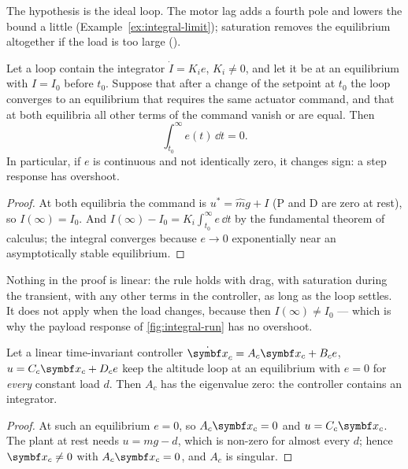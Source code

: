The hypothesis is the ideal loop. The motor lag adds a fourth pole and lowers the bound a little (Example~\ref{ex:integral-limit}); saturation removes the equilibrium altogether if the load is too large ().

\begin{theorem}
\label{thm:integral-area}
Let a loop contain the integrator $\dot I = K_i e$, $K_i \ne 0$, and let it be at an equilibrium with $I = I_0$ before $t_0$. Suppose that after a change of the setpoint at $t_0$ the loop converges to an equilibrium that requires the same actuator command, and that at both equilibria all other terms of the command vanish or are equal. Then
\begin{equation*}
  \int_{t_0}^{\infty} e(t)\,\dd t = 0 .
\end{equation*}
In particular, if $e$ is continuous and not identically zero, it changes sign: a step response has overshoot.
\end{theorem}
\begin{proof}
At both equilibria the command is $u^* = \hat m g + I$ (P and D are zero at rest), so $I(\infty) = I_0$. And $I(\infty) - I_0 = K_i\int_{t_0}^\infty e\,\dd t$ by the fundamental theorem of calculus; the integral converges because $e \to 0$ exponentially near an asymptotically stable equilibrium.
\end{proof}

Nothing in the proof is linear: the rule holds with drag, with saturation during the transient, with any other terms in the controller, as long as the loop settles. It does not apply when the load changes, because then $I(\infty) \ne I_0$ — which is why the payload response of \cref{fig:integral-run} has no overshoot.

\begin{theorem}
\label{thm:integral-imp}
Let a linear time-invariant controller $\dot{\vx}_c = A_c\vx_c + B_c e$, $u = C_c\vx_c + D_c e$ keep the altitude loop at an equilibrium with $e = 0$ for \emph{every} constant load $d$. Then $A_c$ has the eigenvalue zero: the controller contains an integrator.
\end{theorem}
\begin{proof}
At such an equilibrium $e = 0$, so $A_c\vx_c = 0$ and $u = C_c\vx_c$. The plant at rest needs $u = mg - d$, which is non-zero for almost every $d$; hence $\vx_c \ne 0$ with $A_c\vx_c = 0$, and $A_c$ is singular.
\end{proof}


